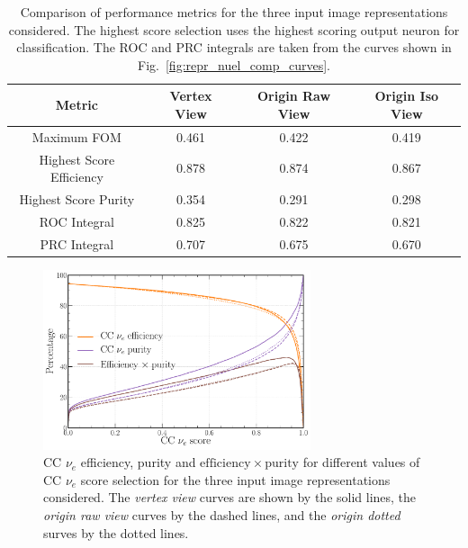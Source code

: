 \begin{table}
    \begin{tabular}{cccc}
        Metric                   & Vertex View & Origin Raw View & Origin Iso View \\
        \midrule
        Maximum FOM              & 0.461       & 0.422           & 0.419           \\
        Highest Score Efficiency & 0.878       & 0.874           & 0.867           \\
        Highest Score Purity     & 0.354       & 0.291           & 0.298           \\
        ROC Integral             & 0.825       & 0.822           & 0.821           \\
        PRC Integral             & 0.707       & 0.675           & 0.670           \\
    \end{tabular}
    \caption[Comparison of performance metrics for three input image representations.]
    {Comparison of performance metrics for the three input image representations considered. The
        highest score selection uses the highest scoring output neuron for classification. The ROC
        and PRC integrals are taken from the curves shown in
        Fig.~\ref{fig:repr_nuel_comp_curves}.}
    \label{tab:repr}
\end{table}

\begin{figure} %
    \includegraphics[width=0.7\textwidth]{diagrams/6-cvn/chipsnet/repr_nuel_eff_curves.pdf}
    \caption[CC $\nu_{e}$ efficiency and purity curves for the three input image representations.]
    {CC $\nu_{e}$ efficiency, purity and $\mathrm{efficiency}\times\mathrm{purity}$ for different
        values of CC $\nu_{e}$ score selection for the three input image representations
        considered. The \emph{vertex view} curves are shown by the solid lines, the \emph{origin
            raw view} curves by the dashed lines, and the \emph{origin dotted} surves by the dotted
        lines.}
    \label{fig:repr_nuel_eff_curves}
\end{figure}

